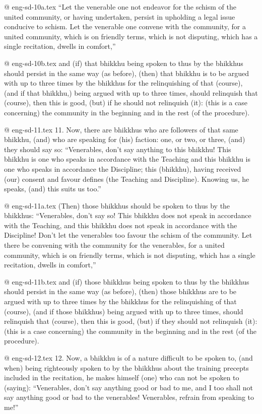 @ eng-sd-10a.tex
“Let the venerable one not endeavor for the schism of the united community, or having undertaken, persist in upholding a legal issue conducive to schism. Let the venerable one convene with the community, for a united community, which is on friendly terms, which is not disputing, which has a single recitation, dwells in comfort,”

@ eng-sd-10b.tex
and (if) that bhikkhu being spoken to thus by the bhikkhus should persist in the same way (as before), (then) that bhikkhu is to be argued with up to three times by the bhikkhus for the relinquishing of that (course), (and if that bhikkhu,) being argued with up to three times, should relinquish that (course), then this is good, (but) if he should not relinquish (it): (this is a case concerning) the community in the beginning and in the rest (of the procedure).

@ eng-sd-11.tex
11. Now, there are bhikkhus who are followers of that same bhikkhu, (and) who are speaking for (his) faction: one, or two, or three, (and) they should say so: “Venerables, don't say anything to this bhikkhu! This bhikkhu is one who speaks in accordance with the Teaching and this bhikkhu is one who speaks in accordance the Discipline; this (bhikkhu), having received (our) consent and favour defines (the Teaching and Discipline). Knowing us, he speaks, (and) this suits us too.”

@ eng-sd-11a.tex
(Then) those bhikkhus should be spoken to thus by the bhikkhus: “Venerables, don't say so! This bhikkhu does not speak in accordance with the Teaching, and this bhikkhu does not speak in accordance with the Discipline! Don't let the venerables too favour the schism of the community. Let there be convening with the community for the venerables, for a united community, which is on friendly terms, which is not disputing, which has a single recitation, dwells in comfort,”

@ eng-sd-11b.tex
and (if) those bhikkhus being spoken to thus by the bhikkhus should persist in the same way (as before), (then) those bhikkhus are to be argued with up to three times by the bhikkhus for the relinquishing of that (course), (and if those bhikkhus) being argued with up to three times, should relinquish that (course), then this is good, (but) if they should not relinquish (it): (this is a case concerning) the community in the beginning and in the rest (of the procedure).

@ eng-sd-12.tex
12. Now, a bhikkhu is of a nature difficult to be spoken to, (and when) being righteously spoken to by the bhikkhus about the training precepts included in the recitation, he makes himself (one) who can not be spoken to (saying): “Venerables, don't say anything good or bad to me, and I too shall not say anything good or bad to the venerables! Venerables, refrain from speaking to me!”

